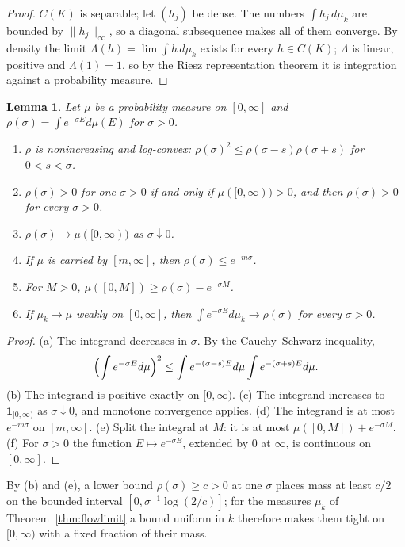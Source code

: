 \documentclass[11pt]{amsart}
\newtheorem{lemma}[theorem]{Lemma}
\theoremstyle{definition}
\theoremstyle{remark}
\numberwithin{equation}{section}
\begin{document}
\begin{proof}
$C(K)$ is separable; let $(h_j)$ be dense. The numbers $\int h_j\,d\mu_k$ are
bounded by $\|h_j\|_\infty$, so a diagonal subsequence makes all of them
converge. By density the limit $\Lambda(h)=\lim\int h\,d\mu_k$ exists for
every $h\in C(K)$; $\Lambda$ is linear, positive and $\Lambda(1)=1$, so by
the Riesz representation theorem it is integration against a probability
measure.
\end{proof}

\begin{lemma}\label{lem:laplace}
Let $\mu$ be a probability measure on $[0,\infty]$ and
$\rho(\sigma)=\int e^{-\sigma E}d\mu(E)$ for $\sigma>0$.
\begin{enumerate}[label=\textup{(\alph*)},leftmargin=*]
\item $\rho$ is nonincreasing and log-convex:
$\rho(\sigma)^2\le\rho(\sigma-s)\rho(\sigma+s)$ for $0<s<\sigma$.
\item $\rho(\sigma)>0$ for one $\sigma>0$ if and only if
$\mu([0,\infty))>0$, and then $\rho(\sigma)>0$ for every $\sigma>0$.
\item $\rho(\sigma)\to\mu([0,\infty))$ as $\sigma\downarrow0$.
\item If $\mu$ is carried by $[m,\infty]$, then $\rho(\sigma)\le
e^{-m\sigma}$.
\item For $M>0$, $\mu([0,M])\ge\rho(\sigma)-e^{-\sigma M}$.
\item If $\mu_k\to\mu$ weakly on $[0,\infty]$, then $\int e^{-\sigma
E}d\mu_k\to\rho(\sigma)$ for every $\sigma>0$.
\end{enumerate}
\end{lemma}

\begin{proof}
(a) The integrand decreases in $\sigma$. By the Cauchy--Schwarz
inequality,
\[
\Bigl(\int e^{-\sigma E}d\mu\Bigr)^2\le\int e^{-(\sigma-s)E}d\mu\int
e^{-(\sigma+s)E}d\mu .
\]
(b) The integrand is positive exactly on
$[0,\infty)$. (c) The integrand increases to $\mathbf 1_{[0,\infty)}$ as
$\sigma\downarrow0$, and monotone convergence applies. (d) The integrand
is at most $e^{-m\sigma}$ on $[m,\infty]$. (e) Split the integral at $M$:
it is at most $\mu([0,M])+e^{-\sigma M}$. (f) For $\sigma>0$ the function
$E\mapsto e^{-\sigma E}$, extended by $0$ at $\infty$, is continuous on
$[0,\infty]$.
\end{proof}

By (b) and (e), a lower bound $\rho(\sigma)\ge c>0$ at one $\sigma$ places
mass at least $c/2$ on the bounded interval $[0,\sigma^{-1}\log(2/c)]$; for
the measures $\mu_k$ of Theorem~\ref{thm:flowlimit} a bound uniform in $k$
therefore makes them tight on $[0,\infty)$ with a fixed fraction of their
mass.
\end{document}
